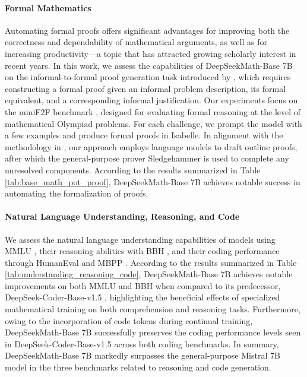 \begin{itemize}[topsep=0pt]
\paragraph{Formal Mathematics}

Automating formal proofs offers significant advantages for improving both the correctness and dependability of mathematical arguments, as well as for increasing productivity—a topic that has attracted growing scholarly interest in recent years. In this work, we assess the capabilities of DeepSeekMath-Base 7B on the informal-to-formal proof generation task introduced by \citep{dsp_proof}, which requires constructing a formal proof given an informal problem description, its formal equivalent, and a corresponding informal justification. Our experiments focus on the miniF2F benchmark \citep{minif2f}, designed for evaluating formal reasoning at the level of mathematical Olympiad problems. For each challenge, we prompt the model with a few examples and produce formal proofs in Isabelle. In alignment with the methodology in \cite{dsp_proof}, our approach employs language models to draft outline proofs, after which the general-purpose prover Sledgehammer \citep{sledgehammer} is used to complete any unresolved components. According to the results summarized in Table \ref{tab:base_math_pot_proof}, DeepSeekMath-Base 7B achieves notable success in automating the formalization of proofs.

\paragraph{Natural Language Understanding, Reasoning, and Code}

We assess the natural language understanding capabilities of models using MMLU \citep{mmlu}, their reasoning abilities with BBH \citep{bbh}, and their coding performance through HumanEval \citep{codex} and MBPP \citep{mbpp}. According to the results summarized in Table \ref{tab:understanding_reasoning_code}, DeepSeekMath-Base 7B achieves notable improvements on both MMLU and BBH when compared to its predecessor, DeepSeek-Coder-Base-v1.5 \citep{deepseek-coder}, highlighting the beneficial effects of specialized mathematical training on both comprehension and reasoning tasks. Furthermore, owing to the incorporation of code tokens during continual training, DeepSeekMath-Base 7B successfully preserves the coding performance levels seen in DeepSeek-Coder-Base-v1.5 across both coding benchmarks. In summary, DeepSeekMath-Base 7B markedly surpasses the general-purpose Mistral 7B model \citep{mistral} in the three benchmarks related to reasoning and code generation.


\end{itemize}
